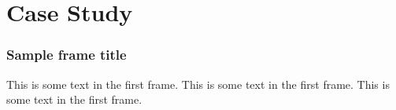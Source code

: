 
\section{Case Study}

\begin{frame}
    \frametitle{Sample frame title}
    This is some text in the first frame. This is some text in the first frame. This is some text in the first frame.
\end{frame}